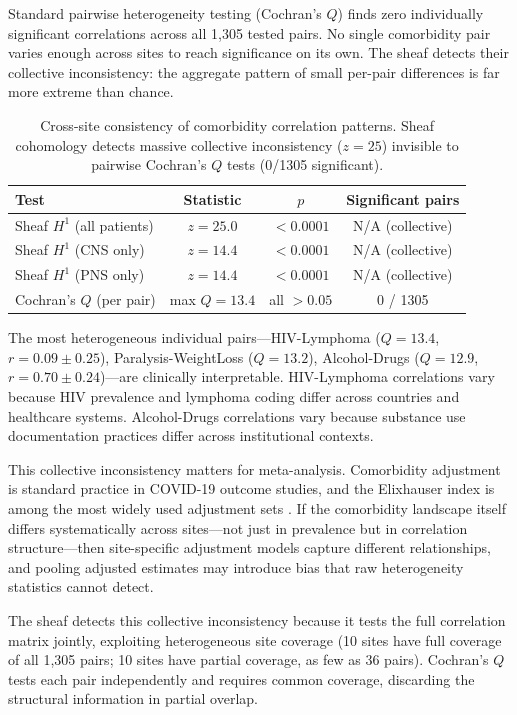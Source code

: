 \documentclass{article}
\begin{document}
Standard pairwise heterogeneity testing (Cochran's $Q$) finds zero individually significant correlations across all 1,305 tested pairs. No single comorbidity pair varies enough across sites to reach significance on its own. The sheaf detects their collective inconsistency: the aggregate pattern of small per-pair differences is far more extreme than chance.

\begin{table}[t]
\centering
\caption{Cross-site consistency of comorbidity correlation patterns. Sheaf cohomology detects massive collective inconsistency ($z = 25$) invisible to pairwise Cochran's $Q$ tests (0/1305 significant).}
\label{tab:sheaf}
\begin{tabular}{lccc}
\toprule
Test & Statistic & $p$ & Significant pairs \\
\midrule
Sheaf $H^1$ (all patients) & $z = 25.0$ & $< 0.0001$ & N/A (collective) \\
Sheaf $H^1$ (CNS only) & $z = 14.4$ & $< 0.0001$ & N/A (collective) \\
Sheaf $H^1$ (PNS only) & $z = 14.4$ & $< 0.0001$ & N/A (collective) \\
Cochran's $Q$ (per pair) & max $Q = 13.4$ & all $> 0.05$ & 0 / 1305 \\
\bottomrule
\end{tabular}
\end{table}

The most heterogeneous individual pairs---HIV-Lymphoma ($Q = 13.4$, $r = 0.09 \pm 0.25$), Paralysis-WeightLoss ($Q = 13.2$), Alcohol-Drugs ($Q = 12.9$, $r = 0.70 \pm 0.24$)---are clinically interpretable. HIV-Lymphoma correlations vary because HIV prevalence and lymphoma coding differ across countries and healthcare systems. Alcohol-Drugs correlations vary because substance use documentation practices differ across institutional contexts.

This collective inconsistency matters for meta-analysis. Comorbidity adjustment is standard practice in COVID-19 outcome studies, and the Elixhauser index is among the most widely used adjustment sets \cite{elixhauser1998}. If the comorbidity landscape itself differs systematically across sites---not just in prevalence but in correlation structure---then site-specific adjustment models capture different relationships, and pooling adjusted estimates may introduce bias that raw heterogeneity statistics cannot detect.

The sheaf detects this collective inconsistency because it tests the full correlation matrix jointly, exploiting heterogeneous site coverage (10 sites have full coverage of all 1,305 pairs; 10 sites have partial coverage, as few as 36 pairs). Cochran's $Q$ tests each pair independently and requires common coverage, discarding the structural information in partial overlap.
\end{document}
